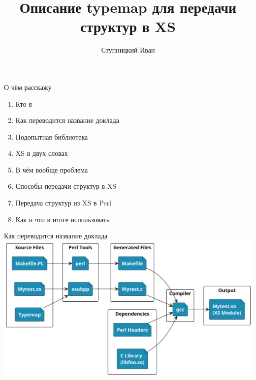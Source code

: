 
\title{Описание typemap для передачи структур в XS}
\author{Ступницкий Иван}

\titleframe

\begin{frame}[fragile]{О чём расскажу}
    \begin{enumerate}
        \item Кто я
        \item Как переводится название доклада
        \item Подопытная библиотека
        \item XS в двух словах
        \item В чём вообще проблема
        \item Способы передачи структур в XS
        \item Передача структур из XS в Perl
        \item Как и что в итоге использовать
    \end{enumerate}
\end{frame}


\begin{frame}[fragile]{Как переводится название доклада}
    \centering
    \hspace{0.5cm}
    \includegraphics[height=\textheight]{snippets/xs-compilation-scheme.png}
\end{frame}

